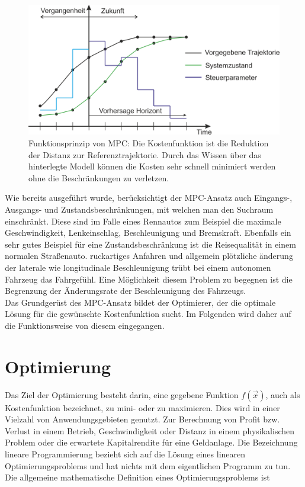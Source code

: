 \documentclass{like}
\begin{document}
\begin{figure}[ht!]
	\centering
	\includegraphics[width=350pt]{Abbildungen/mpcParadigm.png}
	\caption{Funktionsprinzip von \ac{MPC}: Die Kostenfunktion ist die Reduktion der Distanz zur Referenztrajektorie. Durch das Wissen über das hinterlegte Modell können die Kosten sehr schnell minimiert werden ohne die Beschränkungen zu verletzen.}
	\label{fig:mpcTheory}
\end{figure}

Wie bereits ausgeführt wurde, berücksichtigt der \ac{MPC}-Ansatz auch Eingangs-, Ausgangs- und Zustandsbeschränkungen, mit welchen man den Suchraum einschränkt. Diese sind im Falle eines Rennautos zum Beispiel die maximale Geschwindigkeit, Lenkeinschlag, Beschleunigung und Bremskraft. Ebenfalls ein sehr gutes Beispiel für eine Zustandsbeschränkung ist die Reisequalität in einem normalen Straßenauto. ruckartiges Anfahren und allgemein plötzliche änderung der laterale wie longitudinale Beschleunigung trübt bei einem autonomen Fahrzeug das Fahrgefühl. Eine Möglichkeit diesem Problem zu begegnen ist die Begrenzung der Änderungsrate der Beschleunigung des Fahrzeugs.\\

Das Grundgerüst des \ac{MPC}-Ansatz bildet der Optimierer, der die optimale Lösung für die gewünschte Kostenfunktion sucht. Im Folgenden wird daher auf die Funktionsweise von diesem eingegangen.


\section{Optimierung}
Das Ziel der Optimierung besteht darin, eine gegebene Funktion \(f(\vec{x})\), auch als Kostenfunktion bezeichnet, zu mini- oder zu maximieren. 
Dies wird in einer Vielzahl von Anwendungsgebieten genutzt.
Zur Berechnung von Profit bzw. Verlust in einem Betrieb, Geschwindigkeit oder Distanz in einem physikalischen Problem oder die erwartete Kapitalrendite für eine Geldanlage.  
Die Bezeichnung lineare Programmierung bezieht sich auf die Lösung eines linearen  Optimierungsproblems und hat nichts mit dem eigentlichen Programm zu tun. 
Die allgemeine mathematische Definition eines Optimierungsproblems ist
\end{document}
